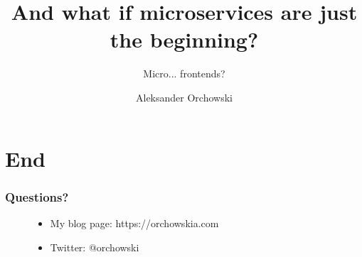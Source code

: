 \documentclass[usenames,dvipsnames]{beamer}
\title{And what if microservices are just the beginning?}
\subtitle{Micro... frontends?}
\author{Aleksander Orchowski}
\begin{document}

 













\section{End}
\begin{frame}[t]
\frametitle{Questions?}
\begin{figure}		
	\begin{itemize}
		\item My blog page: https://orchowskia.com
		\item Twitter: @orchowski
	\end{itemize}
\end{figure}

\end{frame}
\end{document}
